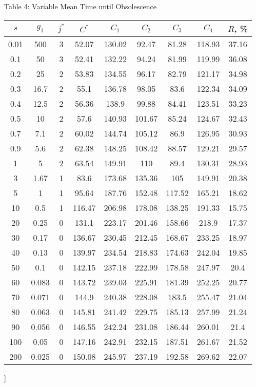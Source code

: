 \documentclass[11pt]{article}
\begin{document}
\newpage
\begin{center}
Table 4: Variable Mean Time until Obsolescence
\\ \vspace{2mm}
\begin{tabular}{|c|c|c|c|c|c|c|c|c|}
  \hline
$s$&  $g_1$ &    $j^*$&  $C^*$&    $C_1$&    $C_2$& $C_3$& $C_4$& $R$, \%\\
\hline 0.01 & 500 & 3 & 52.07 & 130.02 & 92.47 & 81.28 & 118.93 &
37.16 \\
0.1&    50& 3&  52.41&  132.22& 94.24&  81.99&  119.99& 36.08\\
0.2&    25& 2&  53.83&  134.55& 96.17&  82.79&  121.17& 34.98\\
0.3&    16.7&   2&  55.1&   136.78& 98.05&  83.6&   122.34& 34.09\\
0.4&    12.5&   2&  56.36&  138.9&  99.88&  84.41&  123.51& 33.23\\
0.5&    10& 2&  57.6&   140.93& 101.67& 85.24&  124.67& 32.43\\
0.7&    7.1&    2&  60.02&  144.74& 105.12& 86.9&   126.95& 30.93\\
0.9&    5.6&    2&  62.38&  148.25& 108.42& 88.57&  129.21& 29.57\\
1&  5&  2&  63.54&  149.91& 110&    89.4&   130.31& 28.93\\
3&  1.67&   1&  83.6&   173.68& 135.36& 105&    149.91& 20.38\\
5&  1&  1&  95.64&  187.76& 152.48& 117.52& 165.21& 18.62\\
10& 0.5&    1&  116.47& 206.98& 178.08& 138.25& 191.33& 15.75\\
20& 0.25&   0&  131.1&  223.17& 201.46& 158.66& 218.9&  17.37\\
30& 0.17&   0&  136.67& 230.45& 212.45& 168.67& 233.25& 18.97\\
40& 0.13&   0&  139.97& 234.54& 218.83& 174.63& 242.04& 19.85\\
50& 0.1&    0&  142.15& 237.18& 222.99& 178.58& 247.97& 20.4\\
60& 0.083&  0&  143.72& 239.03& 225.91& 181.39& 252.25& 20.77\\
70& 0.071&  0&  144.9&  240.38& 228.08& 183.5&  255.47& 21.04\\
80& 0.063&  0&  145.81& 241.42& 229.75& 185.13& 257.99& 21.24\\
90& 0.056&  0&  146.55& 242.24& 231.08& 186.44& 260.01& 21.4\\
100&    0.05&   0&  147.16& 242.91& 232.15& 187.51& 261.67& 21.52\\
200&    0.025&  0&  150.08& 245.97& 237.19& 192.58& 269.62& 22.07\\
\hline
\end{tabular}
\end{center}]
\end{document}
